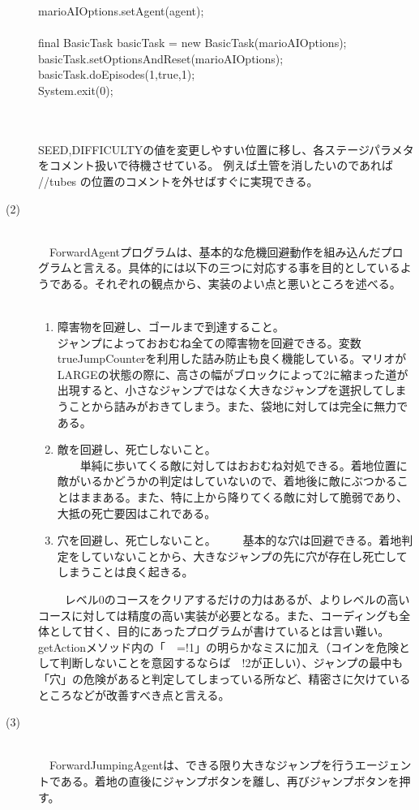 \documentclass[a4j]{jarticle}
\begin{document}
\begin{description}
\begin{screen}
{{    marioAIOptions.setAgent(agent);\\
    \\
    final BasicTask basicTask = new BasicTask(marioAIOptions);\\
    basicTask.setOptionsAndReset(marioAIOptions);\\
    basicTask.doEpisodes(1,true,1);\\
    System.exit(0);\\
}\\
}\\
  \end{screen}
SEED,DIFFICULTYの値を変更しやすい位置に移し、各ステージパラメタをコメント扱いで待機させている。
例えば土管を消したいのであれば //tubes の位置のコメントを外せばすぐに実現できる。
\item[(2)]~\\
　ForwardAgentプログラムは、基本的な危機回避動作を組み込んだプログラムと言える。具体的には以下の三つに対応する事を目的としているようである。それぞれの観点から、実装のよい点と悪いところを述べる。
　\begin{enumerate}
  \item 障害物を回避し、ゴールまで到達すること。~\\
    ジャンプによっておおむね全ての障害物を回避できる。変数trueJumpCounterを利用した詰み防止も良く機能している。マリオがLARGEの状態の際に、高さの幅がブロックによって2に縮まった道が出現すると、小さなジャンプではなく大きなジャンプを選択してしまうことから詰みがおきてしまう。また、袋地に対しては完全に無力である。
　\item 敵を回避し、死亡しないこと。~\\
　　単純に歩いてくる敵に対してはおおむね対処できる。着地位置に敵がいるかどうかの判定はしていないので、着地後に敵にぶつかることはままある。また、特に上から降りてくる敵に対して脆弱であり、大抵の死亡要因はこれである。
　\item 穴を回避し、死亡しないこと。
　　基本的な穴は回避できる。着地判定をしていないことから、大きなジャンプの先に穴が存在し死亡してしまうことは良く起きる。
  \end{enumerate}
　
　レベル0のコースをクリアするだけの力はあるが、よりレベルの高いコースに対しては精度の高い実装が必要となる。また、コーディングも全体として甘く、目的にあったプログラムが書けているとは言い難い。getActionメソッド内の「~~=!1」の明らかなミスに加え（コインを危険として判断しないことを意図するならば~~!2が正しい）、ジャンプの最中も「穴」の危険があると判定してしまっている所など、精密さに欠けているところなどが改善すべき点と言える。
\item[(3)]~\\
　ForwardJumpingAgentは、できる限り大きなジャンプを行うエージェントである。着地の直後にジャンプボタンを離し、再びジャンプボタンを押す。


\end{description}
\end{document}
